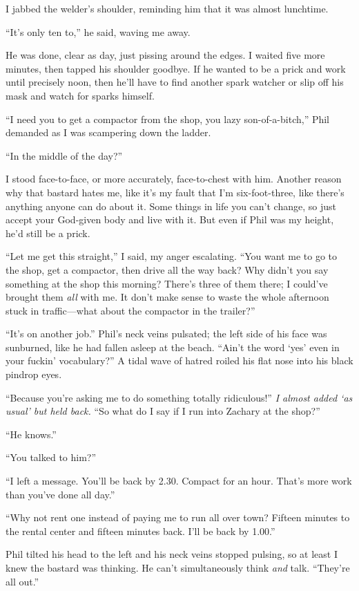 \titlemark

I jabbed the welder's shoulder, reminding him that it was almost
lunchtime.

``It's only ten to,'' he said, waving me away.

He was done, clear as day, just pissing around the edges. I waited five
more minutes, then tapped his shoulder goodbye. If he wanted to be a
prick and work until precisely noon, then he'll have to find another
spark watcher or slip off his mask and watch for sparks himself.

``I need you to get a compactor from the shop, you lazy
son-of-a-bitch,'' Phil demanded as I was scampering down the ladder.

``In the middle of the day?''

I stood face-to-face, or more accurately, face-to-chest with him.
Another reason why that bastard hates me, like it's my fault that I'm
six-foot-three, like there's anything anyone can do about it. Some
things in life you can't change, so just accept your God-given body and
live with it. But even if Phil was my height, he'd still be a prick.

``Let me get this straight,'' I said, my anger escalating. ``You want me
to go to the shop, get a compactor, then drive all the way back? Why
didn't you say something at the shop this morning? There's three of them
there; I could've brought them \emph{all} with me. It don't make sense
to waste the whole afternoon stuck in traffic---what about the compactor
in the trailer?''

``It's on another job.'' Phil's neck veins pulsated; the left side of
his face was sunburned, like he had fallen asleep at the beach. ``Ain't
the word `yes' even in your fuckin' vocabulary?'' A tidal wave of hatred
roiled his flat nose into his black pindrop eyes.

``Because you're asking me to do something totally ridiculous!'' \emph{I
almost added `as usual' but held back.} ``So what do I say if I run into
Zachary at the shop?''

``He knows.''

``You talked to him?''

``I left a message. You'll be back by 2.30. Compact for an hour. That's
more work than you've done all day.''

``Why not rent one instead of paying me to run all over town? Fifteen
minutes to the rental center and fifteen minutes back. I'll be back by
1.00.''

Phil tilted his head to the left and his neck veins stopped pulsing, so
at least I knew the bastard was thinking. He can't simultaneously think
\emph{and} talk. ``They're all out.''

